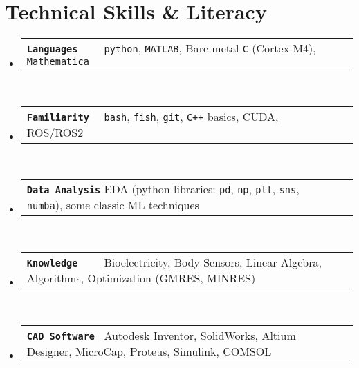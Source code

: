 \newcommand{\resumeSkillSet}[2]{
    \item
    \begin{tabular*}{0.97\textwidth}{l@{\extracolsep{\fill}}r}
      \small #1 \hspace{4mm} #2 \\
    \end{tabular*}\vspace{-7pt}
}
\newcommand{\resumeSkillSetListStart}{\begin{itemize}[leftmargin=0.15in, label={}]}
\newcommand{\resumeSkillSetListEnd}{\end{itemize}}

\section{Technical Skills \& Literacy}
\resumeSkillSetListStart      
\resumeSkillSet
    {\texttt{\textbf{Languages\ \ \ \ }}}
    {\texttt{python}, \texttt{MATLAB}, Bare-metal \texttt{C} (Cortex-M4), \texttt{Mathematica}}\\
\resumeSkillSet
    {\texttt{\textbf{Familiarity\ \ }}}
    {\texttt{bash}, \texttt{fish}, \texttt{git}, \texttt{C++} basics, CUDA, ROS/ROS2}\\
\resumeSkillSet
    {\texttt{\textbf{Data Analysis}}}
    {EDA (python libraries: \texttt{pd}, \texttt{np}, \texttt{plt}, \texttt{sns}, \texttt{numba}), some classic ML techniques}\\
\resumeSkillSet
    {\texttt{\textbf{Knowledge\ \ \ \ }}}
    {Bioelectricity, Body Sensors, Linear Algebra, Algorithms, Optimization (GMRES, MINRES)}\\
\resumeSkillSet
    {\texttt{\textbf{CAD Software\ }}}
    {Autodesk Inventor, SolidWorks, Altium Designer, MicroCap, Proteus, Simulink, COMSOL}\\
\resumeSkillSetListEnd



 

